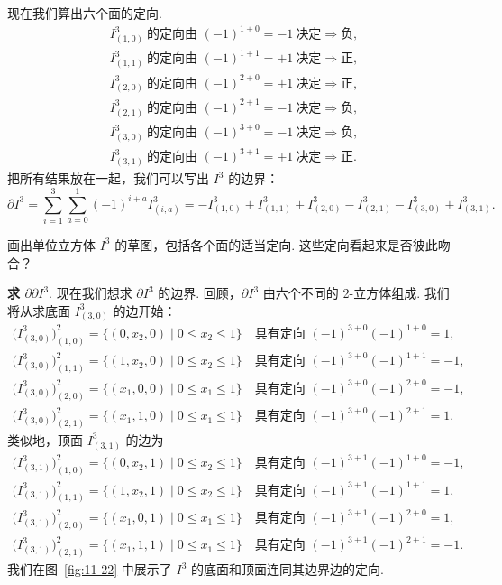 现在我们算出六个面的定向.
\begin{align*}
I^3_{(1,0)}\ \text{的定向由 }(-1)^{1+0}=-1\ \text{决定}\Rightarrow\text{负}, \\
I^3_{(1,1)}\ \text{的定向由 }(-1)^{1+1}=+1\ \text{决定}\Rightarrow\text{正}, \\
I^3_{(2,0)}\ \text{的定向由 }(-1)^{2+0}=+1\ \text{决定}\Rightarrow\text{正}, \\
I^3_{(2,1)}\ \text{的定向由 }(-1)^{2+1}=-1\ \text{决定}\Rightarrow\text{负}, \\
I^3_{(3,0)}\ \text{的定向由 }(-1)^{3+0}=-1\ \text{决定}\Rightarrow\text{负}, \\
I^3_{(3,1)}\ \text{的定向由 }(-1)^{3+1}=+1\ \text{决定}\Rightarrow\text{正}.
\end{align*}
把所有结果放在一起，我们可以写出 $I^3$ 的边界：
\[
\partial I^3=\sum_{i=1}^{3}\sum_{a=0}^{1}(-1)^{i+a}I^3_{(i,a)}
=-I^3_{(1,0)}+I^3_{(1,1)}+I^3_{(2,0)}-I^3_{(2,1)}-I^3_{(3,0)}+I^3_{(3,1)}.
\]

\begin{question}\label{q:11-5}
画出单位立方体 $I^3$ 的草图，包括各个面的适当定向. 这些定向看起来是否彼此吻合？
\end{question}

\textbf{求 $\partial\partial I^3$}. 现在我们想求 $\partial I^3$ 的边界. 回顾，$\partial I^3$ 由六个不同的 2-立方体组成. 我们将从求底面 $I^3_{(3,0)}$ 的边开始：
\begin{align*}
\bigl(I^3_{(3,0)}\bigr)^2_{(1,0)}=\{(0,x_2,0)\mid 0\leq x_2\leq 1\}\quad\text{具有定向 }(-1)^{3+0}(-1)^{1+0}=1, \\
\bigl(I^3_{(3,0)}\bigr)^2_{(1,1)}=\{(1,x_2,0)\mid 0\leq x_2\leq 1\}\quad\text{具有定向 }(-1)^{3+0}(-1)^{1+1}=-1, \\
\bigl(I^3_{(3,0)}\bigr)^2_{(2,0)}=\{(x_1,0,0)\mid 0\leq x_1\leq 1\}\quad\text{具有定向 }(-1)^{3+0}(-1)^{2+0}=-1, \\
\bigl(I^3_{(3,0)}\bigr)^2_{(2,1)}=\{(x_1,1,0)\mid 0\leq x_1\leq 1\}\quad\text{具有定向 }(-1)^{3+0}(-1)^{2+1}=1.
\end{align*}
类似地，顶面 $I^3_{(3,1)}$ 的边为
\begin{align*}
\bigl(I^3_{(3,1)}\bigr)^2_{(1,0)}=\{(0,x_2,1)\mid 0\leq x_2\leq 1\}\quad\text{具有定向 }(-1)^{3+1}(-1)^{1+0}=-1, \\
\bigl(I^3_{(3,1)}\bigr)^2_{(1,1)}=\{(1,x_2,1)\mid 0\leq x_2\leq 1\}\quad\text{具有定向 }(-1)^{3+1}(-1)^{1+1}=1, \\
\bigl(I^3_{(3,1)}\bigr)^2_{(2,0)}=\{(x_1,0,1)\mid 0\leq x_1\leq 1\}\quad\text{具有定向 }(-1)^{3+1}(-1)^{2+0}=1, \\
\bigl(I^3_{(3,1)}\bigr)^2_{(2,1)}=\{(x_1,1,1)\mid 0\leq x_1\leq 1\}\quad\text{具有定向 }(-1)^{3+1}(-1)^{2+1}=-1.
\end{align*}
我们在图~\ref{fig:11-22} 中展示了 $I^3$ 的底面和顶面连同其边界边的定向.

